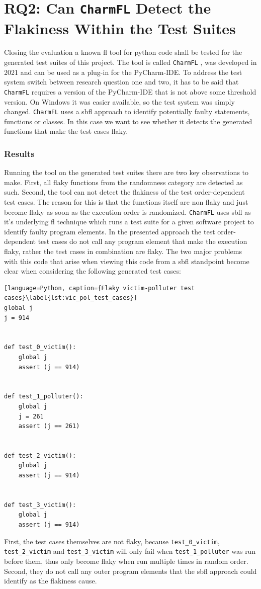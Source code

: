 \documentclass[
fancyheadings, %
%
%
]{stsreprt}
\begin{document}
\section{RQ2: Can \texttt{CharmFL} Detect the Flakiness Within the Test Suites}
Closing the evaluation a known \acrshort{fl} tool for python code shall be tested for the generated test suites of this project. 
The tool is called \texttt{CharmFL} \cite{charmfl:2021}, was developed in 2021 and can be used as a plug-in for the PyCharm-IDE.
To address the test system switch between research question one and two, it has to be said that \texttt{CharmFL} requires a version of the PyCharm-IDE that is not above some threshold version. On Windows it was easier available, so the test system was simply changed. \texttt{CharmFL} uses a \acrlong{sbfl} approach to identify potentially faulty statements, functions or classes. In this case we want to see whether it detects the generated functions that make the test cases flaky. 
\subsubsection{Results}
Running the tool on the generated test suites there are two key observations to make. 
First, all flaky functions from the randomness category are detected as such. 
Second, the tool can not detect the flakiness of the test order-dependent test cases. The reason for this is that the functions itself are non flaky and just become flaky as soon as the execution order is randomized. 
\texttt{CharmFL} uses \acrshort{sbfl} as it's underlying \acrshort{fl} technique which runs a test suite for a given software project to identify faulty program elements. 
In the presented approach the test order-dependent test cases do not call any program element that make the execution flaky, rather the test cases in combination are flaky.
The two major problems with this code that arise when viewing this code from a \acrshort{sbfl} standpoint become clear when considering the following generated test cases:
\begin{lstlisting}[language=Python, caption={Flaky victim-polluter test cases}\label{lst:vic_pol_test_cases}]
global j
j = 914


def test_0_victim():
    global j
    assert (j == 914)


def test_1_polluter():
    global j
    j = 261
    assert (j == 261)


def test_2_victim():
    global j
    assert (j == 914)


def test_3_victim():
    global j
    assert (j == 914)
\end{lstlisting}
First, the test cases themselves are not flaky, because \lstinline{test_0_victim}, \lstinline{test_2_victim} and \lstinline{test_3_victim} will only fail when \lstinline{test_1_polluter} was run before them, thus only become flaky when run multiple times in random order. Second, they do not call any outer program elements that the \acrshort{sbfl} approach could identify as the flakiness cause.   
\end{document}
